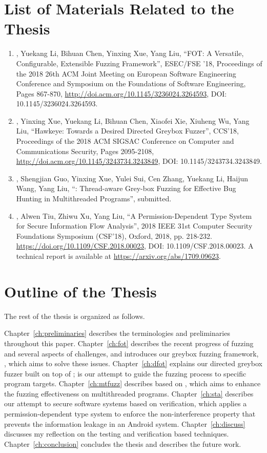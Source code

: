 \section{List of Materials Related to the Thesis}
\begin{enumerate}
	\item \myname, Yuekang Li, Bihuan Chen, Yinxing Xue, Yang Liu, ``FOT: A Versatile, Configurable, Extensible Fuzzing Framework'', ESEC/FSE '18, Proceedings of the 2018 26th ACM Joint Meeting on European Software Engineering Conference and Symposium on the Foundations of Software Engineering, Pages 867-870, \url{http://doi.acm.org/10.1145/3236024.3264593}, DOI: 10.1145/3236024.3264593.
	\item \myname, Yinxing Xue, Yuekang Li, Bihuan Chen, Xiaofei Xie, Xiuheng Wu, Yang Liu, ``Hawkeye: Towards a Desired Directed Greybox Fuzzer'', CCS'18, Proceedings of the 2018 ACM SIGSAC Conference on Computer and Communications Security, Pages 2095-2108, \url{http://doi.acm.org/10.1145/3243734.3243849}, DOI: 10.1145/3243734.3243849.
	\item \myname, Shengjian Guo, Yinxing Xue, Yulei Sui, Cen Zhang, Yuekang Li, Haijun Wang, Yang Liu, ``\mtfuzz: Thread-aware Grey-box Fuzzing for Effective Bug Hunting in Multithreaded Programs'', submitted.
	\item \myname, Alwen Tiu, Zhiwu Xu, Yang Liu, ``A Permission-Dependent Type System for Secure Information Flow Analysis'', 2018 IEEE 31st Computer Security Foundations Symposium (CSF'18), Oxford, 2018, pp. 218-232. \url{https://doi.org/10.1109/CSF.2018.00023}, DOI: 10.1109/CSF.2018.00023. A technical report is available at \url{https://arxiv.org/abs/1709.09623}.
\end{enumerate}

\section{Outline of the Thesis}

The rest of the thesis is organized as follows.

Chapter~\ref{ch:preliminaries} describes the terminologies and preliminaries throughout this paper. Chapter~\ref{ch:fot} describes the recent progress of fuzzing and several aspects of challenges, and introduces our greybox fuzzing framework, \FOT, which aims to solve these issues. Chapter~\ref{ch:dfot} explains our directed greybox fuzzer \dFOT built on top of \FOT; \dFOT is our attempt to guide the fuzzing process to specific program targets. Chapter~\ref{ch:mtfuzz} describes \mtfuzz based on \FOT, which aims to enhance the fuzzing effectiveness on multithreaded programs. Chapter~\ref{ch:sta} describes our attempt to secure software systems based on verification, which applies a permission-dependent type system to enforce the non-interference property that prevents the information leakage in an Android system. Chapter~\ref{ch:discuss} discusses my reflection on the testing and verification based techniques. Chapter~\ref{ch:conclusion} concludes the thesis and describes the future work.